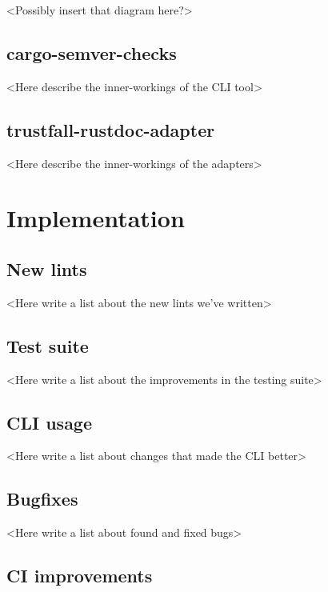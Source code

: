 \documentclass[licencjacka,en]{pracamgr}
\begin{document}
<Possibly insert that diagram here?>


\section{cargo-semver-checks}

<Here describe the inner-workings of the CLI tool>


\section{trustfall-rustdoc-adapter}

<Here describe the inner-workings of the adapters>




\chapter{Implementation}\label{r:implementation}

\section{New lints}

<Here write a list about the new lints we've written>


\section{Test suite}

<Here write a list about the improvements in the testing suite>


\section{CLI usage}

<Here write a list about changes that made the CLI better>


\section{Bugfixes}

<Here write a list about found and fixed bugs>


\section{CI improvements}
\end{document}
